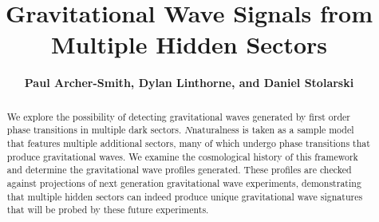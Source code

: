 \documentclass[nofootinbib,twocolumn,preprintnumbers]{revtex4-1}
\begin{document}
\def\lsim{\mathrel{\rlap{\lower4pt\hbox{\hskip1pt$\sim$}}
  \raise1pt\hbox{$<$}}}
\def\gsim{\mathrel{\rlap{\lower4pt\hbox{\hskip1pt$\sim$}}
  \raise1pt\hbox{$>$}}}
\newcommand{\vev}[1]{ \left\langle {#1} \right\rangle }
\newcommand{\bra}[1]{ \langle {#1} | }
\newcommand{\ket}[1]{ | {#1} \rangle }
\newcommand{\ev}{ {\rm eV} }
\newcommand{\kev}{{\rm keV}}
\newcommand{\mev}{{\rm MeV}}
\newcommand{\gev}{{\mathrm GeV}}
\newcommand{\tev}{{\rm TeV}}
\newcommand{\mpl}{$M_{Pl}$}
\newcommand{\mw}{$M_{W}$}
\newcommand{\Ft}{F_{T}}
\newcommand{\Zparity}{\mathbb{Z}_2}
\newcommand{\BLambda}{\boldsymbol{\lambda}}
\newcommand{\met}{\;\not\!\!\!{E}_T}
\newcommand{\beq}{\begin{equation}}
\newcommand{\eeq}{\end{equation}}
\newcommand{\bea}{\begin{eqnarray}}
\newcommand{\eea}{\end{eqnarray}}
\newcommand{\nn}{\nonumber}
\newcommand{\hc}{\mathrm{h.c.}}
\newcommand{\eps}{\epsilon}
\newcommand{\bwt}{\begin{widetext}}
\newcommand{\ewt}{\end{widetext}}
\newcommand{\draftnote}[1]{{\bf\color{blue} #1}}
\newcommand{\cO}{{\cal O}}
\newcommand{\cL}{{\cal L}}
\newcommand{\cM}{{\cal M}}
\newcommand{\fref}[1]{Fig.~\ref{fig:#1}} 
\newcommand{\eref}[1]{Eq.~\eqref{eq:#1}} 
\newcommand{\aref}[1]{Appendix~\ref{app:#1}}
\newcommand{\sref}[1]{Section~\ref{sec:#1}}
\newcommand{\tref}[1]{Table~\ref{tab:#1}}
\title{\LARGE{{\bf{Gravitational Wave Signals from Multiple Hidden Sectors} \\
}}}
\author{{\bf {Paul Archer-Smith, Dylan Linthorne, and Daniel Stolarski}}}
\begin{abstract}
We explore the possibility of detecting gravitational waves generated by first order phase transitions in multiple dark sectors. $N$naturalness is taken as a sample model that features multiple additional sectors, many of which undergo phase transitions that produce gravitational waves. We examine the cosmological history of this framework and determine the gravitational wave profiles generated. These profiles are checked against projections of next generation gravitational wave experiments, demonstrating that multiple hidden sectors can indeed produce unique gravitational wave signatures that will be probed by these future experiments. 
\end{abstract}
\maketitle
\end{document}
